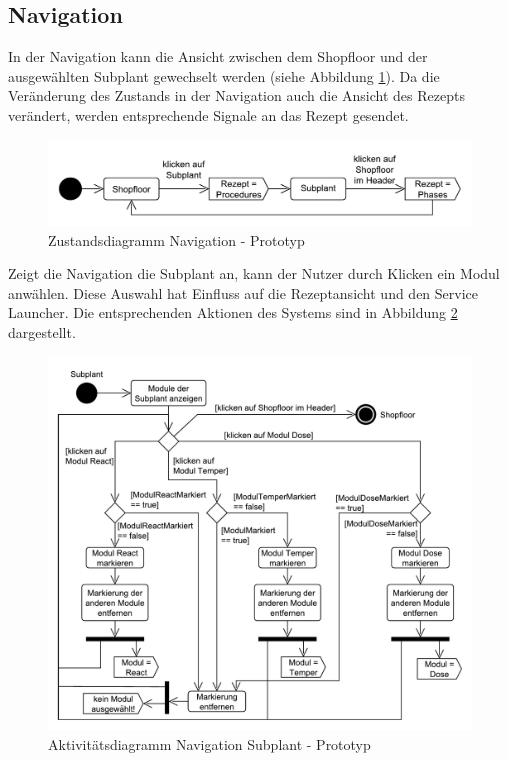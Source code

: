 \subsection{Navigation}
In der Navigation kann die Ansicht zwischen dem Shopfloor und der ausgewählten Subplant  gewechselt werden (siehe Abbildung \ref{pic:Zustandsdiagramm-Navigation}). Da die Veränderung des Zustands in der Navigation auch die Ansicht des Rezepts verändert, werden entsprechende Signale an das Rezept gesendet.
\begin{figure}[htbp]
\centering
\includegraphics[scale=0.65]{DA_files/UML/Prototyp/Zustandsdiagramm-Navigation.pdf}
\caption{Zustandsdiagramm Navigation - Prototyp}
\label{pic:Zustandsdiagramm-Navigation}
\end{figure}

Zeigt die Navigation die Subplant an, kann der Nutzer durch Klicken ein Modul anwählen. Diese Auswahl hat Einfluss auf die Rezeptansicht und den Service Launcher. Die entsprechenden Aktionen des Systems sind in Abbildung \ref{pic:Aktivitaetsdiagramm-Navigation-Subplant} dargestellt.
\begin{figure}[htbp]
\centering
\includegraphics[scale=0.58]{DA_files/UML/Prototyp/Aktivitaetsdiagramm-Navigation-Module.pdf}
\caption{Aktivitätsdiagramm Navigation Subplant - Prototyp}
\label{pic:Aktivitaetsdiagramm-Navigation-Subplant}
\end{figure}

